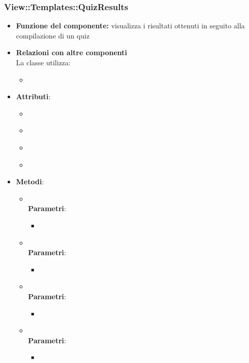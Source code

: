  \subsubsection{View::Templates::QuizResults}
 \begin{itemize}
 \item\textbf{Funzione del componente:} visualizza i risultati ottenuti in seguito alla compilazione di un quiz
 \item\textbf{Relazioni con altre componenti}\\
 La classe utilizza:
 	\begin{itemize}
 		\item
 	\end{itemize}
 \item\textbf{Attributi}:
 	\begin{itemize}
 		\item\code{}\\
 		\item\code{}\\
 		\item\code{}\\
 		\item\code{}\\
 	\end{itemize}
 \item\textbf{Metodi}:
 	\begin{itemize}
 		\item\code{}\\
 		\textbf{Parametri}:
 			\begin{itemize}
 				\item\code{}\\
 			\end{itemize}
 		\item\code{}\\
 		\textbf{Parametri}:
 			\begin{itemize}
 				\item\code{}\\
 			\end{itemize}
 		\item\code{}\\
 		\textbf{Parametri}:
 			\begin{itemize}
 				\item\code{}\\
 			\end{itemize}
 		\item\code{}\\
 		\textbf{Parametri}:
 			\begin{itemize}
 				\item\code{}\\
 			\end{itemize}
 	\end{itemize}
 \end{itemize}
 
